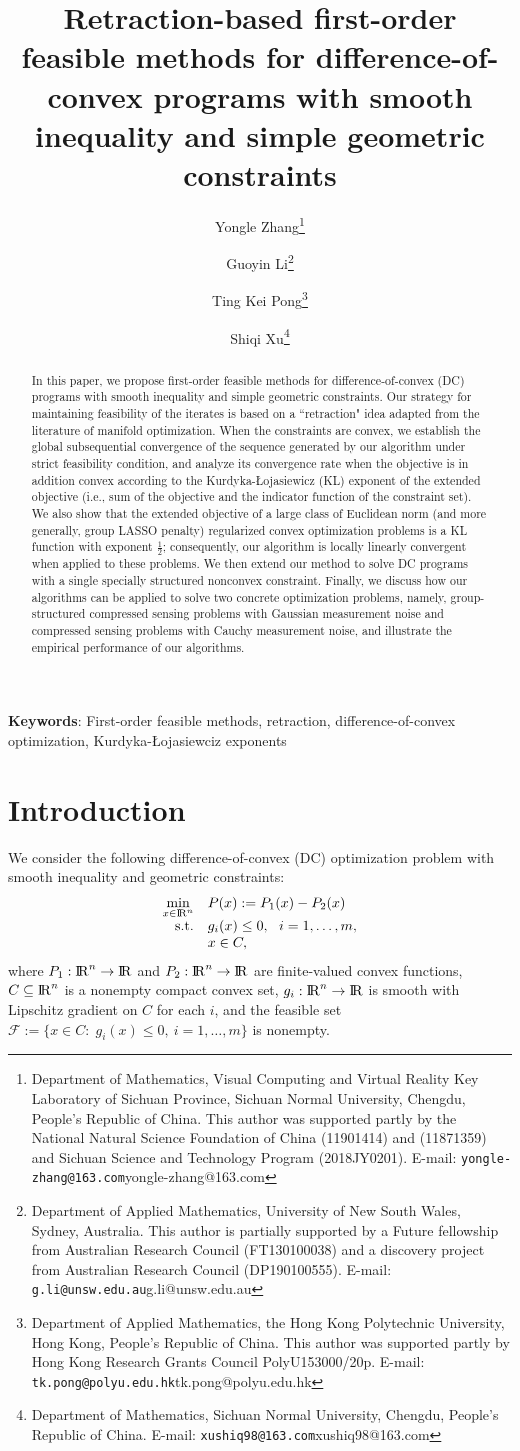 \documentclass[10pt]{article}
\title{\sf Retraction-based first-order feasible methods for difference-of-convex programs with smooth inequality and simple geometric constraints}
\author{
Yongle Zhang\thanks{
        Department of Mathematics, Visual Computing and Virtual Reality Key Laboratory of Sichuan Province, Sichuan Normal University, Chengdu, People's Republic of China.
        This author was supported partly by the National Natural Science Foundation of China (11901414) and (11871359) and Sichuan Science and Technology Program (2018JY0201).
        E-mail: \texttt{yongle-zhang@163.com}{yongle-zhang@163.com}}
\and
Guoyin Li\thanks{
        Department of Applied Mathematics, University of New South Wales, Sydney, Australia.
        This author is partially supported by a Future fellowship from Australian Research Council (FT130100038) and a discovery project from Australian Research Council (DP190100555).
        E-mail: \texttt{g.li@unsw.edu.au}{g.li@unsw.edu.au}}
\and
Ting Kei Pong\thanks{
		Department of Applied Mathematics, the Hong Kong Polytechnic University, Hong Kong, People's Republic of China.
		This author was supported partly by Hong Kong Research Grants Council PolyU153000/20p.
		E-mail: \texttt{tk.pong@polyu.edu.hk}{tk.pong@polyu.edu.hk}}
\and
Shiqi Xu\thanks{
        Department of Mathematics, Sichuan Normal University, Chengdu, People's Republic of China.
        E-mail: \texttt{xushiq98@163.com}{xushiq98@163.com}}
}
\numberwithin{equation}{section}
\def\R{{\rm I\!R}}
\begin{document}
\maketitle

\begin{abstract}
  In this paper, we propose first-order feasible methods for difference-of-convex (DC) programs with smooth inequality and simple geometric constraints. Our strategy for maintaining feasibility of the iterates is based on a ``retraction" idea adapted from the literature of manifold optimization. When the constraints are convex, we establish the global subsequential convergence of the sequence generated by our algorithm under strict feasibility condition, and analyze its convergence rate when the objective is in addition convex according to the Kurdyka-{\L}ojasiewicz (KL) exponent of the extended objective (i.e., sum of the objective and the indicator function of the constraint set). We also show that the extended objective of a large class of Euclidean norm (and more generally, group LASSO penalty) regularized convex optimization problems is a KL function with exponent $\frac12$; consequently, our algorithm is locally linearly convergent when applied to these problems. We then extend our method to solve DC programs with a single specially structured nonconvex constraint. Finally, we discuss how our algorithms can be applied to solve two concrete optimization problems, namely, group-structured compressed sensing problems with Gaussian measurement noise and compressed sensing problems with Cauchy measurement noise, and illustrate the empirical performance of our algorithms.
\end{abstract}

{\small
{\bf Keywords}: First-order feasible methods, retraction, difference-of-convex optimization, Kurdyka-{\L}ojasiewciz exponents
}

\section{Introduction}
We consider the following difference-of-convex (DC) optimization problem with smooth inequality and geometric constraints:
\begin{equation}\label{P0}
  \begin{array}{rl}
\min\limits_{x\in\R^n} & P(x) := P_1(x) - P_2(x)\\
{\rm s.t.} & g_i(x)\leq 0,~~ i = 1,\ldots, m,\\
           & x\in C,
  \end{array}
\end{equation}
where $P_1:\R^n\rightarrow\R$ and $P_2:\R^n\rightarrow\R$ are {\color{blue}finite-valued convex} functions, $C\subseteq \R^n$ is a nonempty compact convex set, $g_i:\R^n\rightarrow\R$ is smooth with Lipschitz gradient on $C$ for each $i$, and the feasible set $\mathcal{F} :=\{x\in C:\; g_i(x)\le 0, ~ i = 1,\ldots, m\}$ is nonempty.
\end{document}

